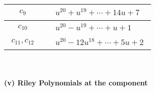 \documentclass[1p]{elsarticle_modified}
\theoremstyle{definition}
\begin{document}
\begin{tabular}{m{50pt}|m{274pt}}
\hline $$\begin{aligned}c_{9}\end{aligned}$$&$\begin{aligned}
&u^{20}+u^{19}+\cdots+14 u+7
\end{aligned}$\\
\hline $$\begin{aligned}c_{10}\end{aligned}$$&$\begin{aligned}
&u^{20}- u^{19}+\cdots+u+1
\end{aligned}$\\
\hline $$\begin{aligned}c_{11},c_{12}\end{aligned}$$&$\begin{aligned}
&u^{20}-12 u^{18}+\cdots+5 u+2
\end{aligned}$\\
\hline
\end{tabular}\\~\\
\newpage\renewcommand{\arraystretch}{1}
\flushleft \textbf{(v) Riley Polynomials at the component}\newline \\
\end{document}
